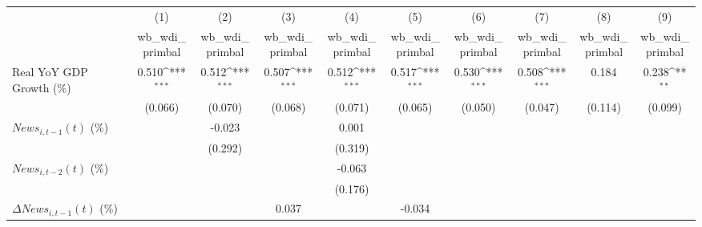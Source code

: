 {
\def\sym#1{\ifmmode^{#1}\else\(^{#1}\)\fi}
\begin{tabular}{l*{9}{c}}
\toprule
                    &\multicolumn{1}{c}{(1)}&\multicolumn{1}{c}{(2)}&\multicolumn{1}{c}{(3)}&\multicolumn{1}{c}{(4)}&\multicolumn{1}{c}{(5)}&\multicolumn{1}{c}{(6)}&\multicolumn{1}{c}{(7)}&\multicolumn{1}{c}{(8)}&\multicolumn{1}{c}{(9)}\\
                    &\multicolumn{1}{c}{wb_wdi_primbal}&\multicolumn{1}{c}{wb_wdi_primbal}&\multicolumn{1}{c}{wb_wdi_primbal}&\multicolumn{1}{c}{wb_wdi_primbal}&\multicolumn{1}{c}{wb_wdi_primbal}&\multicolumn{1}{c}{wb_wdi_primbal}&\multicolumn{1}{c}{wb_wdi_primbal}&\multicolumn{1}{c}{wb_wdi_primbal}&\multicolumn{1}{c}{wb_wdi_primbal}\\
\midrule
Real YoY GDP Growth (\%)&       0.510\sym{***}&       0.512\sym{***}&       0.507\sym{***}&       0.512\sym{***}&       0.517\sym{***}&       0.530\sym{***}&       0.508\sym{***}&       0.184         &       0.238\sym{**} \\
                    &     (0.066)         &     (0.070)         &     (0.068)         &     (0.071)         &     (0.065)         &     (0.050)         &     (0.047)         &     (0.114)         &     (0.099)         \\
\addlinespace
$ News_{i,t-1}(t)$ (\%)&                     &      -0.023         &                     &       0.001         &                     &                     &                     &                     &                     \\
                    &                     &     (0.292)         &                     &     (0.319)         &                     &                     &                     &                     &                     \\
\addlinespace
$ News_{i,t-2}(t)$ (\%)&                     &                     &                     &      -0.063         &                     &                     &                     &                     &                     \\
                    &                     &                     &                     &     (0.176)         &                     &                     &                     &                     &                     \\
\addlinespace
$ \Delta News_{i,t-1}(t)$ (\%)&                     &                     &       0.037         &                     &      -0.034         &                     &                     &                     &                     \\

\end{tabular}}
